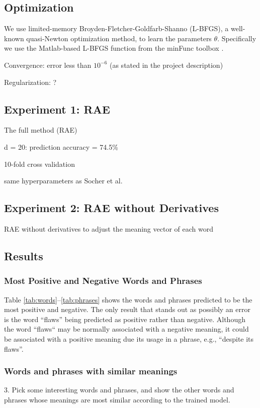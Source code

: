 \documentclass{article}
\begin{document}
%
%
\subsection{Optimization}
We use limited-memory Broyden-Fletcher-Goldfarb-Shanno (L-BFGS), a well-known quasi-Newton optimization method, to learn the parameters $\theta$. Specifically we use the Matlab-based L-BFGS function from the minFunc toolbox \cite{minFunc}.



Convergence: error less than $10^{-6}$ (as stated in the project description)

Regularization: ?


%
%
\subsection{Experiment 1: RAE}
The full method (RAE)

d = 20: prediction accuracy = 74.5\%

10-fold cross validation

same hyperparameters as Socher et al.


%
%
\subsection{Experiment 2: RAE without Derivatives}
RAE without derivatives to adjust the meaning vector of each word



%
%
\subsection{Results}

\subsubsection{Most Positive and Negative Words and Phrases}
Table \ref{tab:words}--\ref{tab:phrases} shows the words and phrases predicted to be the most positive and negative. The only result that stands out as possibly an error is the word ``flaws'' being predicted as positive rather than negative. Although the word ``flaws`` may be normally associated with a negative meaning, it could be associated with a positive meaning due its usage in a phrase, e.g., ``despite its flaws''.

\subsubsection{Words and phrases with similar meanings}
3. Pick some interesting words and phrases, and show the other words and phrases whose meanings are most similar according to the trained model.
\end{document}
